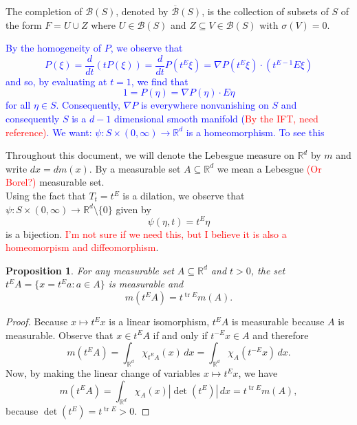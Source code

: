 \documentclass{article}
\theoremstyle{theorem}
\newtheorem{proposition}[theorem]{Proposition}
\theoremstyle{remark}
\newcommand\tr{\operatorname{tr}}
\renewcommand\det{\operatorname{det}}
\begin{document}
The completion of $\mathcal{B}(S)$, denoted by $\overline{\mathcal{B}}(S)$, is the collection of subsets of $S$ of the form $F=U\cup Z$ where $U\in \mathcal{B}(S)$ and $Z\subseteq V\in \mathcal{B}(S)$ with $\sigma(V)=0$.

\textcolor{blue}{
By the homogeneity of $P$, we observe that
\begin{equation*}
P(\xi)=\frac{d}{dt}(tP(\xi))=\frac{d}{dt}P(t^E\xi)=\nabla P(t^E\xi)\cdot (t^{E-1}E\xi)
\end{equation*}
and so, by evaluating at $t=1$, we find that
\begin{equation*}
1=P(\eta)=\nabla P(\eta)\cdot E\eta
\end{equation*}
for all $\eta\in S$. Consequently, $\nabla P$ is everywhere nonvanishing on $S$ and consequently $S$ is a $d-1$ dimensional smooth manifold (\textcolor{red}{By the IFT, need reference)}.  We want: $\psi: S\times (0,\infty)\to\mathbb{R}^d$ is a homeomorphism. To see this}





Throughout this document, we will denote the Lebesgue measure on $\mathbb{R}^d$ by $m$ and write $dx=dm(x)$. By a measurable set $A\subseteq \mathbb{R}^d$ we mean a Lebesgue \textcolor{red}{(Or Borel?)} measurable set. \\

Using the fact that $T_t=t^E$ is a dilation, we observe that $\psi:S\times (0,\infty)\to \mathbb{R}^d\setminus\{0\}$ given by
\begin{equation}\label{eq:MainBijection}
\psi(\eta,t)=t^E\eta
\end{equation}
is a bijection. \textcolor{red}{I'm not sure if we need this, but I believe it is also a homeomorpism and diffeomorphism}.

\begin{proposition}\label{prop:Scaling}
For any measurable set $A\subseteq\mathbb{R}^d$ and $t>0$, the set $t^E A=\{x=t^E a:a\in A\}$ is measurable and
\begin{equation*}
m(t^E A)=t^{\tr E}m(A).
\end{equation*}
\end{proposition}
\begin{proof}
Because $x\mapsto t^E x$ is a linear isomorphism, $t^E A$ is measurable because $A$ is measurable. Observe that $x\in t^E A$ if and only if $t^{-E}x\in A$ and therefore
\begin{equation*}
m(t^E A)=\int_{\mathbb{R}^d}\chi_{t^E A}(x)\,dx=\int_{\mathbb{R}^d}\chi_{A}(t^{-E}x)\,dx.
\end{equation*}
Now, by making the linear change of variables $x\mapsto t^E x$, we have
\begin{equation*}
m(t^E A)=\int_{\mathbb{R}^d}\chi_A(x)|\det(t^E)|\,dx=t^{\tr E}m(A),
\end{equation*}
because $\det(t^E)=t^{\tr E}>0$.
\end{proof}
\end{document}
